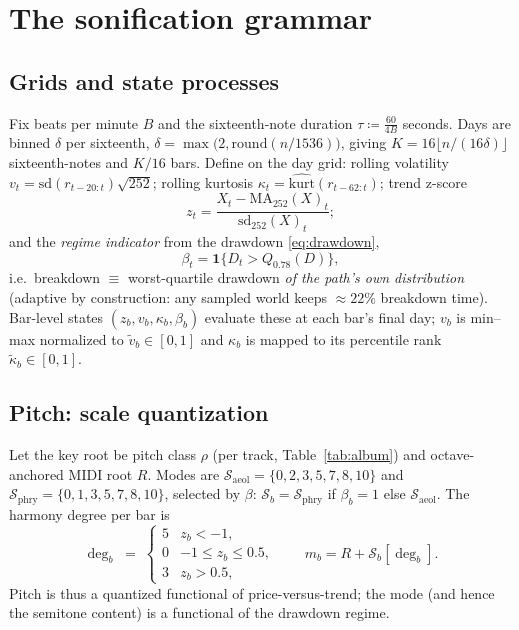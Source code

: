 \documentclass[11pt,a4paper]{article}
\newcommand{\ind}{\mathbf{1}}
\begin{document}
\section{The sonification grammar}\label{sec:grammar}

\subsection{Grids and state processes}

Fix beats per minute $B$ and the sixteenth-note duration
$\tau \coloneqq \tfrac{60}{4B}$ seconds. Days are binned $\delta$ per sixteenth,
$\delta = \max\bigl(2, \mathrm{round}(n/1536)\bigr)$, giving
$K = 16\lfloor n/(16\delta)\rfloor$ sixteenth-notes and $K/16$ bars. Define on
the day grid: rolling volatility $v_t = \mathrm{sd}(r_{t-20:t})\sqrt{252}$;
rolling kurtosis $\kappa_t = \widehat{\mathrm{kurt}}(r_{t-62:t})$; trend z-score
\begin{equation}
z_t = \frac{X_t - \mathrm{MA}_{252}(X)_t}{\mathrm{sd}_{252}(X)_t};
\end{equation}
and the \emph{regime indicator} from the drawdown \eqref{eq:drawdown},
\begin{equation}
\beta_t = \ind\bigl\{ D_t > Q_{0.78}(D) \bigr\},
\label{eq:regime}
\end{equation}
i.e.\ breakdown $\equiv$ worst-quartile drawdown \emph{of the path's own
distribution} (adaptive by construction: any sampled world keeps
$\approx 22\%$ breakdown time). Bar-level states $(z_b, v_b, \kappa_b, \beta_b)$
evaluate these at each bar's final day; $v_b$ is min--max normalized to
$\tilde v_b \in[0,1]$ and $\kappa_b$ is mapped to its percentile rank
$\tilde\kappa_b\in[0,1]$.

\subsection{Pitch: scale quantization}

Let the key root be pitch class $\rho$ (per track, Table~\ref{tab:album}) and
octave-anchored MIDI root $R$. Modes are
$\mathcal S_{\text{aeol}} = \{0,2,3,5,7,8,10\}$ and
$\mathcal S_{\text{phry}} = \{0,1,3,5,7,8,10\}$, selected by
$\beta$: $\mathcal S_b = \mathcal S_{\text{phry}}$ if $\beta_b=1$ else
$\mathcal S_{\text{aeol}}$. The harmony degree per bar is
\begin{equation}
\deg_b \;=\;
\begin{cases}
5 & z_b < -1,\\
0 & -1 \le z_b \le 0.5,\\
3 & z_b > 0.5,
\end{cases}
\qquad
m_b = R + \mathcal S_b[\deg_b] .
\end{equation}
Pitch is thus a quantized functional of price-versus-trend; the mode (and hence
the semitone content) is a functional of the drawdown regime.
\end{document}

